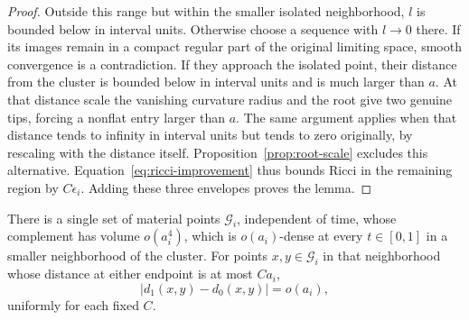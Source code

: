 \begin{proof}
Outside this range but within the smaller isolated neighborhood,
$l$ is bounded below in interval units.  Otherwise choose a sequence
with $l\to0$ there.  If its images remain in a compact regular part
of the original limiting space, smooth convergence is a
contradiction.  If they approach the isolated point, their
distance from the cluster is bounded below in interval units and
is much larger than $a$.  At that distance scale the vanishing
curvature radius and the root give two genuine tips, forcing a
nonflat entry larger than $a$.  The same argument applies when
that distance tends to infinity in interval units but tends to
zero originally, by rescaling with the distance itself.
Proposition~\ref{prop:root-scale} excludes this alternative.
Equation~\eqref{eq:ricci-improvement} thus bounds Ricci in the
remaining region by $C\epsilon_i$.  Adding these three envelopes
proves the lemma.
\end{proof}

\begin{lemma}
\label{final:good-points}
There is a single set of material points $\mathcal G_i$, independent
of time, whose complement has volume $o(a_i^4)$, which is $o(a_i)$-dense
at every $t\in[0,1]$ in a smaller neighborhood of the cluster.
For points $x,y\in\mathcal G_i$ in that neighborhood whose distance
at either endpoint is at most $Ca_i$,
\begin{equation}\label{final:good-distance}
 |d_1(x,y)-d_0(x,y)|=o(a_i),
\end{equation}
uniformly for each fixed $C$.
\end{lemma}

